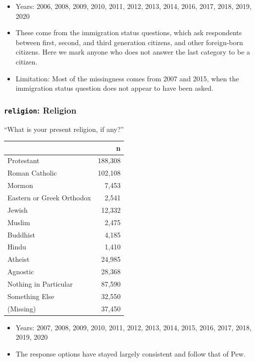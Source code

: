 \documentclass[10pt,article,oneside]{memoir}
\theoremstyle{definition}
\begin{document}
\begin{itemize}
\tightlist
\item
  Years: 2006, 2008, 2009, 2010, 2011, 2012, 2013, 2014, 2016, 2017,
  2018, 2019, 2020
\item
  These come from the immigration status questions, which ask
  respondents between first, second, and third generation citizens, and
  other foreign-born citizens. Here we mark anyone who does not answer
  the last category to be a citizen.
\item
  Limitation: Most of the missingness comes from 2007 and 2015, when the
  immigration status question does not appear to have been asked.
\end{itemize}

\hypertarget{religion-religion}{%
\subsubsection{\texorpdfstring{\texttt{religion}:
Religion}{religion: Religion}}\label{religion-religion}}

``What is your present religion, if any?''

\begin{table}[H]
\centering
\begin{tabular}{lr}
\toprule
 & n\\
\midrule
Protestant & 188,308\\
Roman Catholic & 102,108\\
Mormon & 7,453\\
Eastern or Greek Orthodox & 2,541\\
Jewish & 12,332\\
Muslim & 2,475\\
Buddhist & 4,185\\
Hindu & 1,410\\
Atheist & 24,985\\
Agnostic & 28,368\\
Nothing in Particular & 87,590\\
Something Else & 32,550\\
(Missing) & 37,450\\
\bottomrule
\end{tabular}
\end{table}

\begin{itemize}
\tightlist
\item
  Years: 2007, 2008, 2009, 2010, 2011, 2012, 2013, 2014, 2015, 2016,
  2017, 2018, 2019, 2020
\item
  The response options have stayed largely consistent and follow that of
  Pew.
\end{itemize}
\end{document}
